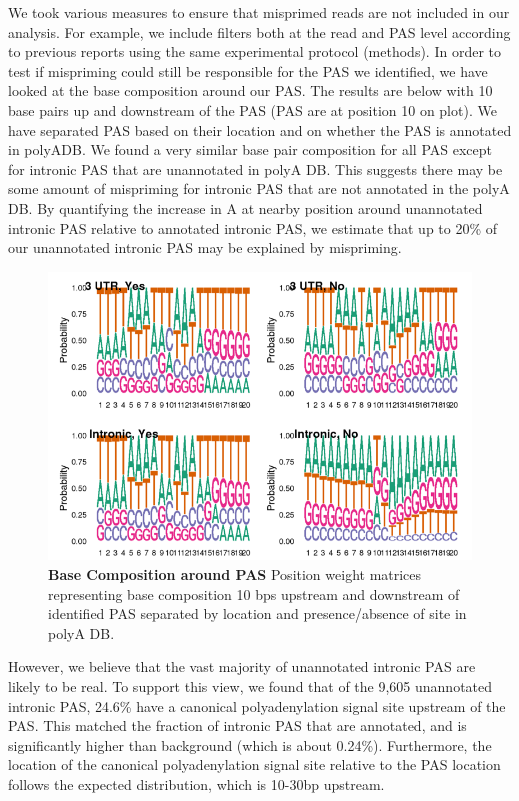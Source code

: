 We took various measures to ensure that misprimed reads are not included in our analysis. For example, we include filters both at the read and PAS level according to previous reports using the same experimental protocol (methods). In order to test if mispriming could still be responsible for the PAS we identified, we have looked at the base composition around our PAS. The results are below with 10 base pairs up and downstream of the PAS (PAS are at position 10 on plot). We have separated PAS based on their location and on whether the PAS is annotated in polyADB. We found a very similar base pair composition for all PAS except for intronic PAS that are unannotated in polyA DB. This suggests there may be some amount of mispriming for intronic PAS that are not annotated in the polyA DB. By quantifying the increase in A at nearby position around unannotated intronic PAS relative to annotated intronic PAS, we estimate that up to 20\% of our unannotated intronic PAS may be explained by mispriming. 


\begin{figure}
\centering \includegraphics[width=5in]{img/ch02/figureAppendix6.png}
\caption[Base Composition around PAS]{\textbf{Base Composition around PAS} Position weight matrices representing base composition 10 bps upstream and downstream of identified PAS separated by location and presence/absence of site in polyA DB.}
\label{fig:Supplementaryfile1-Fig6}
\end{figure} 


However, we believe that the vast majority of unannotated intronic PAS are likely to be real. To support this view, we found that of the 9,605 unannotated intronic PAS, 24.6\% have a canonical polyadenylation signal site upstream of the PAS. This matched the fraction of intronic PAS that are annotated, and is significantly higher than background (which is about 0.24\%). Furthermore, the location of the canonical polyadenylation signal site relative to the PAS location follows the expected distribution, which is 10-30bp upstream.   



